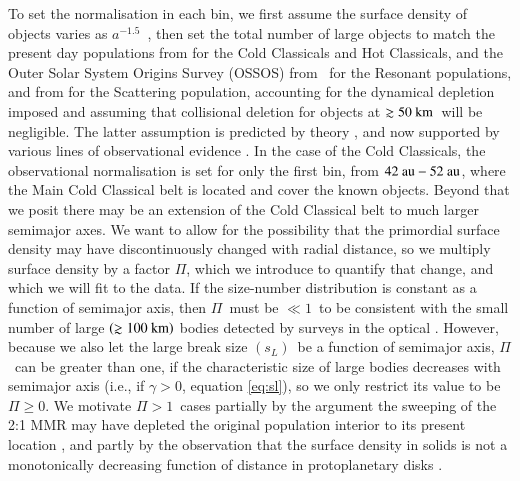 \documentclass[printer]{aa}
\begin{document}
To set the normalisation in each bin, we first assume the surface density of objects varies as $a^{-1.5}$~\citep{1977Ap&SS..51..153W}, then set the total number of large objects to match the present day populations from \citet{2014ApJ...782..100F} for the Cold Classicals and Hot Classicals, and the Outer Solar System Origins Survey (OSSOS) from \citet{2016AJ....152...23V}~for the Resonant populations, and from \citet{2018AJ....155..197L} for the Scattering population, accounting for the dynamical depletion imposed and assuming that collisional deletion for objects at $\gtrsim 50~\rm{km}$~will be negligible.  The latter assumption is predicted by theory \citep{2005Icar..173..342P, 2012A&A...540A..30V}, and now supported by various lines of observational evidence \citep{2012ApJ...744..139P, 2020Sci...367.6620M}.  In the case of the Cold Classicals, the observational normalisation is set for only the first bin, from $42~\rm{au} - 52~\rm{au}$, where the Main Cold Classical belt is located and cover the known objects.  Beyond that we posit there may be an extension of the Cold Classical belt to much larger semimajor axes.  We want to allow for the possibility that the primordial surface density may have discontinuously changed with radial distance, so we multiply surface density by a factor $\Pi$, which we introduce to quantify that change, and which we will fit to the data.  If the size-number distribution is constant as a function of semimajor axis, then $\Pi$~must be $\ll1$~to be consistent with the small number of large $\left( \gtrsim 100~\rm{km} \right)$ bodies detected by surveys in the optical \citep{2016AJ....152...70B}.  However, because we also let the large break size $\left(s_L\right)$~be a function of semimajor axis, $\Pi$~can be greater than one, if the characteristic size of large bodies decreases with semimajor axis (i.e., if $\gamma > 0$, equation \ref{eq:sl}), so we only restrict its value to be $\Pi \geq 0$.  We motivate $\Pi > 1$~cases partially by the argument the sweeping of the 2:1 MMR may have depleted the original population interior to its present location \citep{2015AJ....150...68N, 2017NatAs...1E..88F}, and partly by the observation that the surface density in solids is not a monotonically decreasing function of distance in protoplanetary disks \citep{2015ApJ...808L...3A,2018ApJ...869L..41A}.
\end{document}
